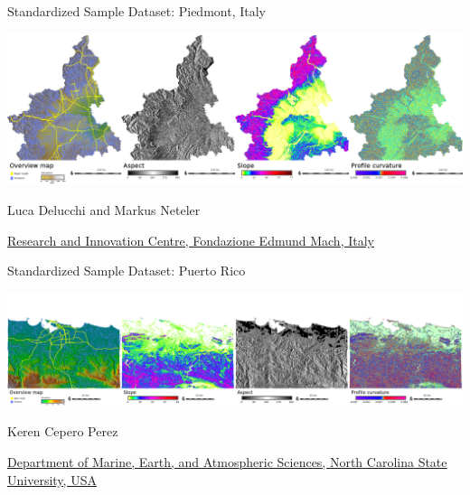 \documentclass[xcolor={dvipsnames,usenames},beamer]{beamer}
\begin{document}
\begin{frame}{Standardized Sample Dataset: Piedmont, Italy}

\begin{center}
\includegraphics[width=\textwidth]{./images/dataset/std_dataset_it_stripe.png}
\end{center}


Luca Delucchi and Markus Neteler

{\scriptsize
\href{http://gis.cri.fmach.it/}{Research and Innovation Centre, Fondazione Edmund Mach, Italy}
}

\end{frame}

\begin{frame}{Standardized Sample Dataset: Puerto Rico}

\begin{center}
\includegraphics[width=\textwidth]{./images/dataset/std_dataset_pr_stripe.png}
\end{center}

Keren Cepero Perez

{\scriptsize
\href{http://www.meas.ncsu.edu/}%
{Department of Marine, Earth, and Atmospheric Sciences,
North Carolina State University, USA}
}

\end{frame}
\end{document}
